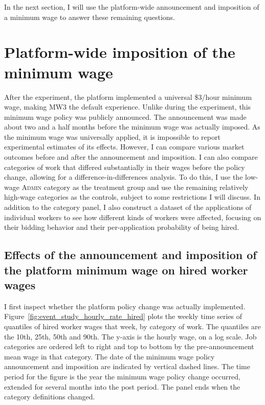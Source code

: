\documentclass[AER]{AEA}
\newcommand{\admin}{\textsc{Admin}}
\begin{document}
In the next section, I will use the platform-wide announcement and imposition of a minimum wage to answer these remaining questions.

\section{Platform-wide imposition of the minimum wage} \label{sec:market_wide}

After the experiment, the platform implemented a universal \$3/hour minimum wage, making MW3 the default experience.
Unlike during the experiment, this minimum wage policy was publicly announced. 
The announcement was made about two and a half months before the minimum wage was actually imposed.
As the minimum wage was universally applied, it is impossible to report experimental estimates of its effects. 
However, I can compare various market outcomes before and after the announcement and imposition.
I can also compare categories of work that differed substantially in their wages before the policy change, allowing for a difference-in-differences analysis.
To do this, I use the low-wage \admin{} category as the treatment group and use the remaining relatively high-wage categories as the controls, subject to some restrictions I will discuss.
In addition to the category panel, I also construct a dataset of the applications of individual workers to see how different kinds of workers were affected, focusing on their bidding behavior and their per-application probability of being hired. 

\subsection{Effects of the announcement and imposition of the platform minimum wage on hired worker wages} 
I first inspect whether the platform policy change was actually implemented.
Figure~\ref{fig:event_study_hourly_rate_hired} plots the weekly time series of quantiles of hired worker wages that week, by category of work.
The quantiles are the 10th, 25th, 50th and 90th.
The y-axis is the hourly wage, on a log scale.
Job categories are ordered left to right and top to bottom by the pre-announcement mean wage in that category.
The date of the minimum wage policy announcement and imposition are indicated by vertical dashed lines.
The time period for the figure is the year the minimum wage policy change occurred, extended for several months into the post period.
The panel ends when the category definitions changed.
\end{document}
